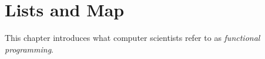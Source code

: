 \chapter{Lists and Map}

This chapter introduces what computer scientists refer to as \emph{functional programming}. 

